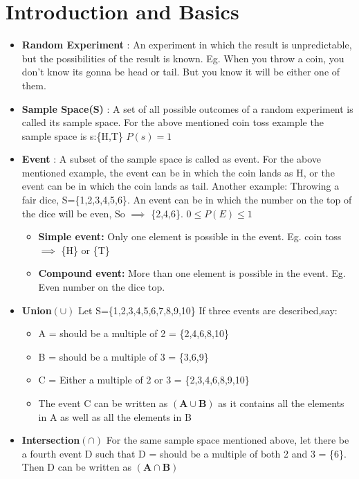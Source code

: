 \documentclass[8pt]{report}
\begin{document}
\section{Introduction and Basics}
	\begin{itemize}
		\item \textbf{Random Experiment} : An experiment in which the result is unpredictable, but the possibilities of the result is known. Eg. When you throw a coin, you don't know its gonna be head or tail. But you know it will be either one of them.
		\item \textbf{Sample Space(S)} : A set of all possible outcomes of a random experiment is called its sample space. For the above mentioned coin toss example the sample space is s:\{H,T\} $\boxed{P(s)=1}$
		\item \textbf{Event} : A subset of the sample space is called as event. For the above mentioned example, the event can be in which the coin lands as H, or the event can be in which the coin lands as tail. Another example: Throwing a fair dice, S=\{1,2,3,4,5,6\}. An event can be in which the number on the top of the dice will be even, So $\implies$ \{2,4,6\}. $\boxed{0\le P(E)\le1}$
		\begin{itemize}
			\item \textbf{Simple event:} Only one element is possible in the event. Eg. coin toss $\implies$ \{H\} or \{T\}
			\item \textbf{Compound event:} More than one element is possible in the event. Eg. Even number on the dice top.
		\end{itemize}
		 \item \textbf{Union}$\pmb{(\cup)}$ Let S=\{1,2,3,4,5,6,7,8,9,10\} If three events are described,say: 
		 	\begin{itemize}
		 		\item A = should be a multiple of 2 = \{2,4,6,8,10\}
		 		\item B = should be a multiple of 3 = \{3,6,9\}
		 		\item C = Either a multiple of 2 or 3 = \{2,3,4,6,8,9,10\}
		 		\item The event C can be written as $\pmb{(A\cup B)}$ as it contains all the elements in A as well as all the elements in B
		 	\end{itemize}
		 \item \textbf{Intersection}$\pmb{(\cap)}$ For the same sample space mentioned above, let there be a fourth event D such that D = should be a multiple of both 2 and 3 = \{6\}. Then D can be written as $\pmb{(A\cap B)}$

\end{itemize}
\end{document}
